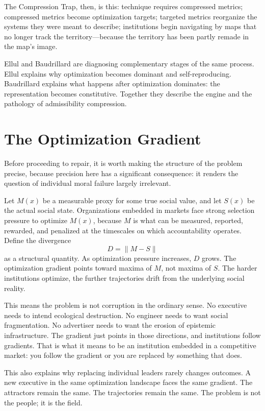 \documentclass[11pt, letterpaper]{article}
\begin{document}
The Compression Trap, then, is this: technique requires compressed metrics; compressed metrics become optimization targets; targeted metrics reorganize the systems they were meant to describe; institutions begin navigating by maps that no longer track the territory---because the territory has been partly remade in the map's image.

Ellul and Baudrillard are diagnosing complementary stages of the same process. Ellul explains why optimization becomes dominant and self-reproducing. Baudrillard explains what happens after optimization dominates: the representation becomes constitutive. Together they describe the engine and the pathology of admissibility compression.

\section{The Optimization Gradient}

Before proceeding to repair, it is worth making the structure of the problem precise, because precision here has a significant consequence: it renders the question of individual moral failure largely irrelevant.

Let $M(x)$ be a measurable proxy for some true social value, and let $S(x)$ be the actual social state. Organizations embedded in markets face strong selection pressure to optimize $M(x)$, because $M$ is what can be measured, reported, rewarded, and penalized at the timescales on which accountability operates. Define the divergence
\[
  D = \|M - S\|
\]
as a structural quantity. As optimization pressure increases, $D$ grows. The optimization gradient points toward maxima of $M$, not maxima of $S$. The harder institutions optimize, the further trajectories drift from the underlying social reality.

This means the problem is not corruption in the ordinary sense. No executive needs to intend ecological destruction. No engineer needs to want social fragmentation. No advertiser needs to want the erosion of epistemic infrastructure. The gradient just points in those directions, and institutions follow gradients. That is what it means to be an institution embedded in a competitive market: you follow the gradient or you are replaced by something that does.

This also explains why replacing individual leaders rarely changes outcomes. A new executive in the same optimization landscape faces the same gradient. The attractors remain the same. The trajectories remain the same. The problem is not the people; it is the field.
\end{document}
